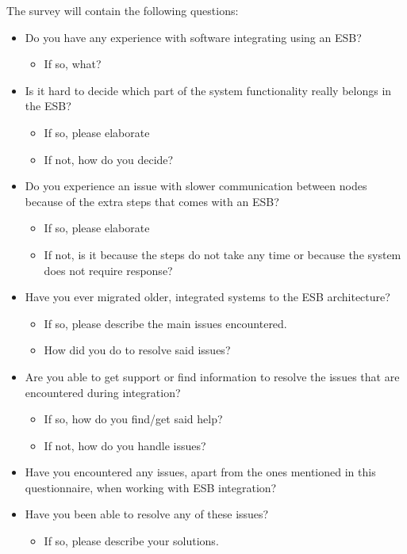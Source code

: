 \documentclass{llncs}
\begin{document}
The survey will contain the following questions:
\label{survey}
\begin{itemize}

\item Do you have any experience with software integrating using an ESB?
\begin{itemize}
\item If so, what?
\end{itemize}

\item Is it hard to decide which part of the system functionality really belongs in the ESB?
\begin{itemize}
\item If so, please elaborate
\item If not, how do you decide?
\end{itemize}

\item Do you experience an issue with slower communication between nodes because of the extra steps that comes with an ESB?
\begin{itemize}
\item If so, please elaborate
\item If not, is it because the steps do not take any time or because the system does not require response?
\end{itemize}

\item Have you ever migrated older, integrated systems to the ESB architecture?
\begin{itemize}
\item If so, please describe the main issues encountered.
\item How did you do to resolve said issues?
\end{itemize}

\item Are you able to get support or find information to resolve the issues that are encountered during integration?
\begin{itemize}
\item If so, how do you find/get said help?
\item If not, how do you handle issues?
\end{itemize}

\item Have you encountered any issues, apart from the ones mentioned in this questionnaire, when working with ESB integration?

\item Have you been able to resolve any of these issues?
\begin{itemize}
\item If so, please describe your solutions.
\end{itemize}

\end{itemize}
\end{document}
